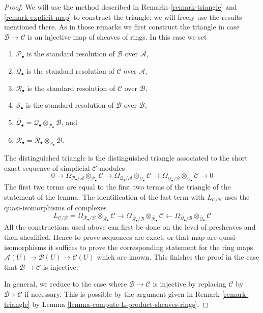 \begin{proof}
We will use the method described in
Remarks \ref{remark-triangle} and \ref{remark-explicit-map}
to construct the triangle; we will freely use the results mentioned there.
As in those remarks we first construct the triangle in case
$\mathcal{B} \to \mathcal{C}$ is an injective map of sheaves of rings.
In this case we set
\begin{enumerate}
\item $\mathcal{P}_\bullet$ is the standard resolution of $\mathcal{B}$
over $\mathcal{A}$,
\item $\mathcal{Q}_\bullet$ is the standard resolution of $\mathcal{C}$
over $\mathcal{A}$,
\item $\mathcal{R}_\bullet$ is the standard resolution of $\mathcal{C}$
over $\mathcal{B}$,
\item $\mathcal{S}_\bullet$ is the standard resolution of $\mathcal{B}$
over $\mathcal{B}$,
\item $\overline{\mathcal{Q}}_\bullet =
\mathcal{Q}_\bullet \otimes_{\mathcal{P}_\bullet} \mathcal{B}$, and
\item $\overline{\mathcal{R}}_\bullet =
\mathcal{R}_\bullet \otimes_{\mathcal{S}_\bullet} \mathcal{B}$.
\end{enumerate}
The distinguished triangle is the distinguished triangle associated
to the short exact sequence
of simplicial $\mathcal{C}$-modules
$$
0 \to
\Omega_{\mathcal{P}_\bullet/\mathcal{A}}
\otimes_{\mathcal{P}_\bullet} \mathcal{C} \to
\Omega_{\mathcal{Q}_\bullet/\mathcal{A}}
\otimes_{\mathcal{Q}_\bullet} \mathcal{C} \to
\Omega_{\overline{\mathcal{Q}}_\bullet/\mathcal{B}}
\otimes_{\overline{\mathcal{Q}}_\bullet} \mathcal{C} \to 0
$$
The first two terms are equal to the first two terms of the triangle
of the statement of the lemma. The identification of the last term with
$L_{\mathcal{C}/\mathcal{B}}$ uses the quasi-isomorphisms of complexes
$$
L_{\mathcal{C}/\mathcal{B}} =
\Omega_{\mathcal{R}_\bullet/\mathcal{B}}
\otimes_{\mathcal{R}_\bullet} \mathcal{C}
\longrightarrow
\Omega_{\overline{\mathcal{R}}_\bullet/\mathcal{B}}
\otimes_{\overline{\mathcal{R}}_\bullet} \mathcal{C}
\longleftarrow
\Omega_{\overline{\mathcal{Q}}_\bullet/\mathcal{B}}
\otimes_{\overline{\mathcal{Q}}_\bullet} \mathcal{C}
$$
All the constructions used above can first be done on the level
of presheaves and then sheafified. Hence to prove sequences are exact,
or that map are quasi-isomorphisms it suffices to prove the corresponding
statement for the ring maps
$\mathcal{A}(U) \to \mathcal{B}(U) \to \mathcal{C}(U)$
which are known. This finishes the proof in the case that
$\mathcal{B} \to \mathcal{C}$ is injective.

\medskip\noindent
In general, we reduce to the case where $\mathcal{B} \to \mathcal{C}$ is
injective by replacing $\mathcal{C}$ by $\mathcal{B} \times \mathcal{C}$ if
necessary. This is possible by the argument given in
Remark \ref{remark-triangle} by
Lemma \ref{lemma-compute-L-product-sheaves-rings}.
\end{proof}

